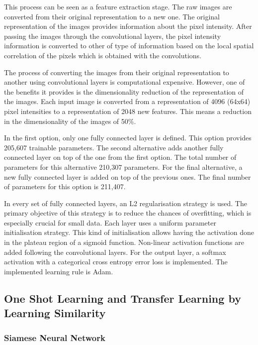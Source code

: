 \documentclass{article}
\begin{document}
This process can be seen as a feature extraction stage. The raw images are converted from their original representation to a new one. The original representation of the images provides information about the pixel intensity. After passing the images through the convolutional layers, the pixel intensity information is converted to other of type of information based on the local spatial correlation of the pixels which is obtained with the convolutions.

The process of converting the images from their original representation to another using convolutional layers is computational expensive. However, one of the benefits it provides is the dimensionality reduction of the representation of the images. Each input image is converted from a representation of 4096 (64x64) pixel intensities to a representation of 2048 new features. This means a reduction in the dimensionality of the images of 50\%.

In the first option, only one fully connected layer is defined. This option provides 205,607 trainable parameters. The second alternative adds another fully connected layer on top of the one from the first option. The total number of parameters for this alternative 210,307 parameters. For the final alternative, a new fully connected layer is added on top of the previous ones. The final number of parameters for this option is 211,407.

In every set of fully connected layers, an L2 regularisation strategy is used. The primary objective of this strategy is to reduce the chances of overfitting, which is especially crucial for small data. Each layer uses a uniform parameter initialisation strategy. This kind of initialisation allows having the activation done in the plateau region of a sigmoid function. Non-linear activation functions are added following the convolutional layers. For the output layer, a softmax activation with a categorical cross entropy error loss is implemented. The implemented learning rule is Adam.

\subsection{One Shot Learning and Transfer Learning by Learning Similarity}
\label{sec:oneshot}

\subsubsection{\textbf{Siamese Neural Network}}
\end{document}
